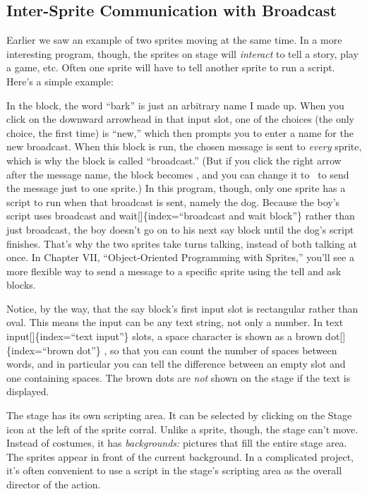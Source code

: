 \documentclass[
  letterpaper,
]{book}
\begin{document}
\subsection{Inter-Sprite Communication with
Broadcast}\label{inter-sprite-communication-with-broadcast}

Earlier we saw an example of two sprites moving at the same time. In a
more interesting program, though, the sprites on stage will
\emph{interact} to tell a story, play a game, etc. Often one sprite will
have to tell another sprite to run a script. Here's a simple example:

In the block, the word ``bark'' is just an arbitrary name I made up.
When you click on the downward arrowhead in that input slot, one of the
choices (the only choice, the first time) is ``new,'' which then prompts
you to enter a name for the new broadcast. When this block is run, the
chosen message is sent to \emph{every} sprite, which is why the block is
called ``broadcast.'' (But if you click the right arrow after the
message name, the block becomes , and you can change it to ~to send the
message just to one sprite.) In this program, though, only one sprite
has a script to run when that broadcast is sent, namely the dog. Because
the boy's script uses broadcast and wait{[}{]}\{index=``broadcast and
wait block''\} rather than just broadcast, the boy doesn't go on to his
next say block until the dog's script finishes. That's why the two
sprites take turns talking, instead of both talking at once. In Chapter
VII, ``Object-Oriented Programming with Sprites,'' you'll see a more
flexible way to send a message to a specific sprite using the tell and
ask blocks.

Notice, by the way, that the say block's first input slot is rectangular
rather than oval. This means the input can be any text string, not only
a number. In text input{[}{]}\{index=``text input''\} slots, a space
character is shown as a brown dot{[}{]}\{index=``brown dot''\} , so that
you can count the number of spaces between words, and in particular you
can tell the difference between an empty slot and one containing spaces.
The brown dots are \emph{not} shown on the stage if the text is
displayed.

The stage has its own scripting area. It can be selected by clicking on
the Stage icon at the left of the sprite corral. Unlike a sprite,
though, the stage can't move. Instead of costumes, it has
\emph{backgrounds:} pictures that fill the entire stage area. The
sprites appear in front of the current background. In a complicated
project, it's often convenient to use a script in the stage's scripting
area as the overall director of the action.
\end{document}
